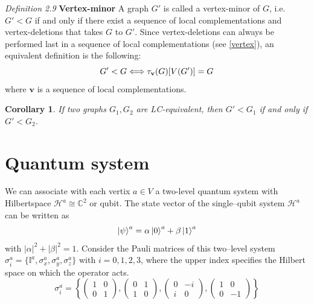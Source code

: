 \documentclass[10pt,a4paper]{book}
\numberwithin{equation}{chapter}
\numberwithin{figure}{chapter}
\numberwithin{table}{chapter}
\newtheorem{corollary}{Corollary}
\begin{document}
\textit{Definition 2.9} \textbf{Vertex-minor} A graph $G'$ is called a vertex-minor of $G$, i.e. $G' < G$ if and only if there exist a sequence of local complementations and vertex-deletions that takes $G$ to $G'$. Since vertex-deletions can always be performed last in a sequence of local complementations (see \autoref{vertex}), an equivalent definition is the following: 
\begin{equation}
G' < G \\ \Longleftrightarrow \\ \tau_{\textbf{v}}(G)[V(G')]=G
\end{equation}
where $\textbf{v}$ is a sequence of local complementations.

\begin{corollary}
If two graphs $G_{1},G_{2}$ are LC-equivalent, then $G' < G_1$ if and only if $G' < G_2$.
\end{corollary}

\section{Quantum system}
We can associate with each vertix $a\in V$ a two-level quantum system with Hilbertspace $\mathcal{H}^a\cong \mathbb{C}^2$ or qubit. The state vector of the single–qubit system $\mathcal{H}^a$ can be written as
\begin{equation}
\ket{\psi}^{a}=\alpha \ket{0}^{a}+\beta \ket{1}^{a}
\end{equation} 
with $|\alpha|^2 + |\beta|^2 =1$. Consider the Pauli matrices of this two–level system
$\sigma^{a}_i = \lbrace \mathbb{I}^a , \sigma^{a}_x , \sigma^{a}_y , \sigma^{a}_z \rbrace$ with $i=0,1,2,3$, where the upper index specifies the Hilbert space on which the operator acts.
\begin{equation}
\sigma^{a}_i=\left\lbrace \left( \begin{array}{cc}1&0\\0&1 \end{array}\right),\left(\begin{array}{cc}0&1\\1&0 \end{array}\right),\left(\begin{array}{cc}0&-i\\i&0 \end{array}\right),\left(\begin{array}{cc}1&0\\0&-1 \end{array}\right) \right\rbrace
\end{equation}
\end{document}
